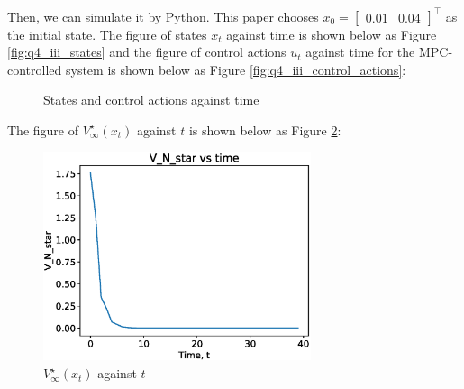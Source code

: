 \documentclass[a4paper,11pt,reqno]{amsart}
\newcommand{\tran}{\intercal}
\begin{document}
Then, we can simulate it by Python. This paper chooses $x_0 = \begin{bmatrix} 0.01 & 0.04 \end{bmatrix}^{\tran}$ as the initial state. The figure of states $x_t$ against time is shown below as Figure \ref{fig:q4_iii_states}
and the figure of control actions $u_t$ against time for the MPC-controlled system is shown below as Figure \ref{fig:q4_iii_control_actions}:
\begin{figure}[H]
    \centering
    \vspace{-0.35cm}
    \subfigtopskip=2pt
    \subfigbottomskip=2pt
    \subfigcapskip=-5pt
    \quad
    \caption{States and control actions against time}
    \label{fig:q4_iii}
\end{figure}
The figure of $V^{\star}_{\infty}(x_t) $ against $t$ is shown below as Figure \ref{fig:q4_iii_cost}:
\begin{figure}[H]
    \centering
    \includegraphics[width=0.7\textwidth]{figures/q4_iii_cost.eps}
    \caption{$V^{\star}_{\infty}(x_t) $ against $t$}
    \label{fig:q4_iii_cost}
\end{figure}




\end{document}
